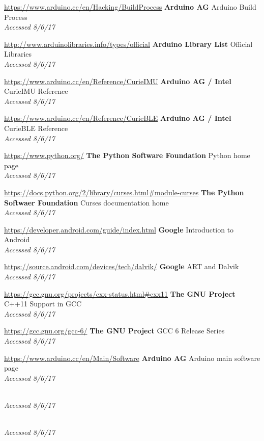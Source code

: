 \documentclass[a4paper]{article}
\begin{document}
\begin{thebibliography}{9}
\url{https://www.arduino.cc/en/Hacking/BuildProcess}
\textbf{Arduino AG}
Arduino Build Process
\\\textit{Accessed 8/6/17}


\url{http://www.arduinolibraries.info/types/official}
\textbf{Arduino Library List}
Official Libraries
\\\textit{Accessed 8/6/17}

\url{https://www.arduino.cc/en/Reference/CurieIMU}
\textbf{Arduino AG / Intel}
CurieIMU Reference
\\\textit{Accessed 8/6/17}

\url{https://www.arduino.cc/en/Reference/CurieBLE}
\textbf{Arduino AG / Intel}
CurieBLE Reference
\\\textit{Accessed 8/6/17}

\url{https://www.python.org/}
\textbf{The Python Software Foundation}
Python home page
\\\textit{Accessed 8/6/17}

\url{https://docs.python.org/2/library/curses.html#module-curses}
\textbf{The Python Softwaer Foundation}
Curses documentation home
\\\textit{Accessed 8/6/17}

\url{https://developer.android.com/guide/index.html}
\textbf{Google}
Introduction to Android
\\\textit{Accessed 8/6/17}

\url{https://source.android.com/devices/tech/dalvik/}
\textbf{Google}
ART and Dalvik
\\\textit{Accessed 8/6/17}

\url{https://gcc.gnu.org/projects/cxx-status.html#cxx11}
\textbf{The GNU Project}
C++11 Support in GCC
\\\textit{Accessed 8/6/17}

\url{https://gcc.gnu.org/gcc-6/}
\textbf{The GNU Project}
GCC 6 Release Series
\\\textit{Accessed 8/6/17}

\url{https://www.arduino.cc/en/Main/Software}
\textbf{Arduino AG}
Arduino main software page
\\\textit{Accessed 8/6/17}

\url{}
\textbf{}
\\\textit{Accessed 8/6/17}

\url{}
\textbf{}
\\\textit{Accessed 8/6/17}


\end{thebibliography}
\end{document}
